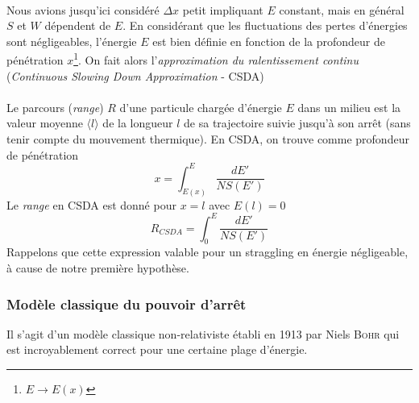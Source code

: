 \ \\

Nous avions jusqu'ici considéré $\Delta x$ petit impliquant $E$ constant, mais en général $S$
et $W$ dépendent de $E$. En considérant que les fluctuations des pertes d'énergies sont 
négligeables, l'énergie $E$ est bien définie en fonction de la profondeur de pénétration 
$x$\footnote{$E\to E(x)$}. On fait alors l'\textit{approximation du ralentissement continu}
(\textit{Continuous Slowing Down Approximation} - CSDA)\ \\

\ \\

Le parcours (\textit{range}) $R$ d'une particule chargée d'énergie $E$ dans un milieu est 
la valeur moyenne $\langle l \rangle$ de la longueur $l$ de sa trajectoire suivie 
jusqu'à son arrêt (sans tenir compte du mouvement thermique). En CSDA, on trouve comme 
profondeur de pénétration
\begin{equation}
x=\int^{E}_{E(x)}\frac{dE'}{NS(E')}
\end{equation}
Le \textit{range} en CSDA est donné pour $x=l$ avec $E(l)=0$
\begin{equation}
R_{CSDA}=\int^{E}_{0}\frac{dE'}{NS(E')}
\end{equation}
Rappelons que cette expression valable pour un straggling en énergie négligeable, à cause 
de notre première hypothèse.


\subsubsection{Modèle classique du pouvoir d'arrêt}
Il s'agit d'un modèle classique non-relativiste établi en 1913 par Niels \textsc{Bohr} qui
est incroyablement correct pour une certaine plage d'énergie.\\

